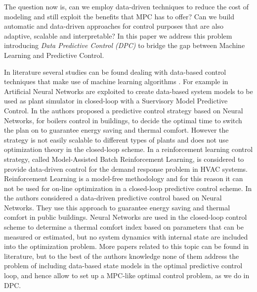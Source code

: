 	
The question now is, can we employ data-driven techniques to reduce the cost of modeling and still exploit the benefits that MPC has to offer? Can we build automatic and data-driven approaches for control purposes that are also adaptive, scalable and interpretable? In this paper we address this problem introducing \textit{Data Predictive Control (DPC)} to bridge the gap between Machine Learning and Predictive Control.

In literature several studies can be found dealing with data-based control techniques that make use of machine learning algorithms \cite{Hou2013}. For example in \cite{Afram2017} Artificial Neural Networks are exploited to create data-based system models to be used as plant simulator in closed-loop with a Suervisory Model Predictive Control. In \cite{Macarulla2017} the authors proposed a predictive control strategy based on Neural Networks, for boilers control in buildings, to decide the optimal time to switch the plan on to guarantee energy saving and thermal comfort. However the strategy is not easily scalable to different types of plants and does not use optimization theory in the closed-loop scheme. In \cite{Costanzo2016} a reinforcement learning control strategy, called Model-Assisted Batch Reinforcement Learning, is considered to provide data-driven control for the demand response problem in HVAC systems. Reinforcement Learning is a model-free methodology and for this reason it can not be used for on-line optimization in a closed-loop predictive control scheme. In \cite{Ferreira2012} the authors considered a data-driven predictive control based on Neural Networks. They use this approach to guarantee energy saving and  thermal comfort in public buildings. Neural Networks are used in the closed-loop control scheme to determine a thermal comfort index based on parameters that can be measured or estimated, but no  system dynamics with internal state are included into the optimization problem. More papers related to this topic can be found in literature, but to the best of the authors knowledge none of them address the problem of including data-based state models in the optimal predictive control loop, and hence allow to set up a MPC-like optimal control problem, as we do in DPC. 

